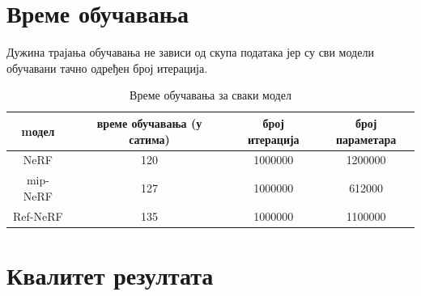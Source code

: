 \documentclass[12pt, a4paper, twoside]{book}
\numberwithin{equation}{chapter}
\numberwithin{theorem}{section}
\numberwithin{definition}{section}
\numberwithin{definitionChapter}{chapter}
\begin{document}
\section{Време обучавања}

Дужина трајања обучавања не зависи од скупа података јер су сви модели обучавани тачно одређен број итерација.

	\begin{table}[H]
		\centering
		\begin{tabular}{cccc} \toprule
			{mодел} 	& {време обучавања (у сатима)} 	& {број итерација} & {број параметара} \\ \midrule
			{NeRF} 		& 120 							& 1000000 & 1200000\\ 
			{mip-NeRF} 	& 127 							& 1000000 & 612000\\
			{Ref-NeRF} 	& 135 							& 1000000 & 1100000\\ \bottomrule
		\end{tabular}
		\caption{Време обучавања за сваки модел}
		\label{table-duration}
	\end{table}


\section{Квалитет резултата}
\end{document}
